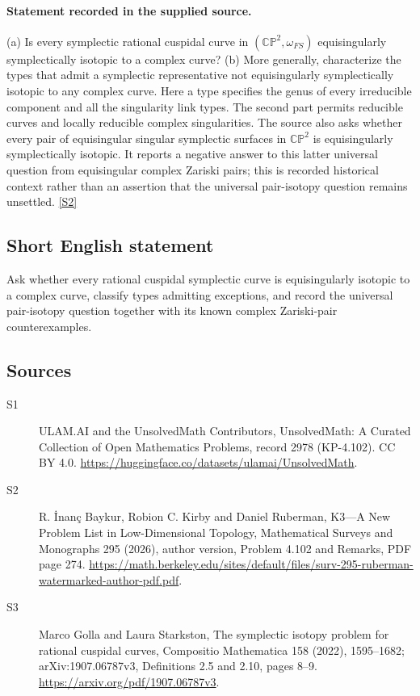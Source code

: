 \documentclass[11pt]{article}
\newcommand{\sref}[2]{\hyperlink{source:#1:#2}{[S#2]}}
\begin{document}
\paragraph{Statement recorded in the supplied source.}
(a) Is every symplectic rational cuspidal curve in $(\mathbb{CP}^2,\omega_{FS})$ equisingularly symplectically isotopic to a complex curve? (b) More generally, characterize the types that admit a symplectic representative not equisingularly symplectically isotopic to any complex curve. Here a type specifies the genus of every irreducible component and all the singularity link types. The second part permits reducible curves and locally reducible complex singularities. The source also asks whether every pair of equisingular singular symplectic surfaces in $\mathbb{CP}^2$ is equisingularly symplectically isotopic. It reports a negative answer to this latter universal question from equisingular complex Zariski pairs; this is recorded historical context rather than an assertion that the universal pair-isotopy question remains unsettled. \sref{2978}{2}
\subsection{Short English statement}
Ask whether every rational cuspidal symplectic curve is equisingularly isotopic to a complex curve, classify types admitting exceptions, and record the universal pair-isotopy question together with its known complex Zariski-pair counterexamples.
\subsection{Sources}
\begin{description}
\item[\hypertarget{source:2978:1}{S1}] ULAM.AI and the UnsolvedMath Contributors, UnsolvedMath: A Curated Collection of Open Mathematics Problems, record 2978 (KP-4.102). CC BY 4.0. \url{https://huggingface.co/datasets/ulamai/UnsolvedMath}.
\item[\hypertarget{source:2978:2}{S2}] R. İnanç Baykur, Robion C. Kirby and Daniel Ruberman, K3—A New Problem List in Low-Dimensional Topology, Mathematical Surveys and Monographs 295 (2026), author version, Problem 4.102 and Remarks, PDF page 274. \url{https://math.berkeley.edu/sites/default/files/surv-295-ruberman-watermarked-author-pdf.pdf}.
\item[\hypertarget{source:2978:3}{S3}] Marco Golla and Laura Starkston, The symplectic isotopy problem for rational cuspidal curves, Compositio Mathematica 158 (2022), 1595--1682; arXiv:1907.06787v3, Definitions 2.5 and 2.10, pages 8--9. \url{https://arxiv.org/pdf/1907.06787v3}.
\end{description}
\label{end:2978}
\end{document}

